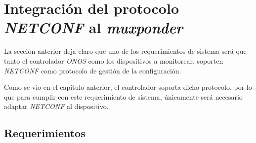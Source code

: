 \newpage

  \section{Integración del protocolo \textit{NETCONF} al \textit{muxponder}}
  La sección anterior deja claro que uno de los requerimientos de sistema será que tanto el controlador \textit{ONOS} como los dispositivos a monitorear, soporten \textit{NETCONF} como protocolo de gestión de la configuración. 
  
  Como se vio en el capítulo anterior, el controlador soporta dicho protocolo, por lo que para cumplir con este requerimiento de sistema, únicamente será necesario adaptar \textit{NETCONF} al dispositivo. 
  

  \subsection{Requerimientos}

